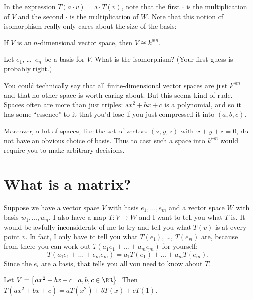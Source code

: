 In the expression $T(a \cdot v) = a \cdot T(v)$, note that the first $\cdot$ is the multiplication of $V$ and the second $\cdot$ is the multiplication of $W$.
Note that this notion of isomorphism really only cares about the size of the basis:
\begin{proposition}
	If $V$ is an $n$-dimensional vector space, then
	$V \cong k^{\oplus n}$.
\end{proposition}
\begin{ques}
	Let $e_1$, \dots, $e_n$ be a basis for $V$.
	What is the isomorphism?
	(Your first guess is probably right.)
\end{ques}
\begin{remark}
	You could technically say that all finite-dimensional vector
	spaces are just $k^{\oplus n}$ and that no other space is worth
	caring about.
	But this seems kind of rude.
	Spaces often are more than just triples: $ax^2+bx+c$ is a polynomial,
	and so it has some ``essence'' to it that you'd lose if you
	just compressed it into $(a,b,c)$.

	Moreover, a lot of spaces, like the set of vectors $(x,y,z)$ with $x+y+z=0$,
	do not have an obvious choice of basis.
	Thus to cast such a space into $k^{\oplus n}$
	would require you to make arbitrary decisions.
\label{rem:vector_spaces_have_essence}
\end{remark}

\section{What is a matrix?}

Suppose we have a vector space $V$ with basis $e_1, \dots, e_m$
and a vector space $W$ with basis $w_1, \dots, w_n$.
I also have a map $T : V \to W$ and I want to tell you what $T$ is.
It would be awfully inconsiderate of me to try and tell you what $T(v)$
is at every point $v$.
In fact, I only have to tell you what $T(e_1)$, \dots, $T(e_m)$ are,
because from there you can work out $T(a_1e_1 + \dots + a_me_m)$ for yourself:
\[ T(a_1e_1 + \dots + a_me_m) = a_1T(e_1) + \dots + a_mT(e_m). \]
Since the $e_i$ are a basis, that tells you all you need to know about $T$.
\begin{example}
	Let $V = \left\{ ax^2+bx+c \mid a,b,c \in \RR \right\}$.
	Then $T(ax^2+bx+c) = aT(x^2) + bT(x) + cT(1)$.
\end{example}

